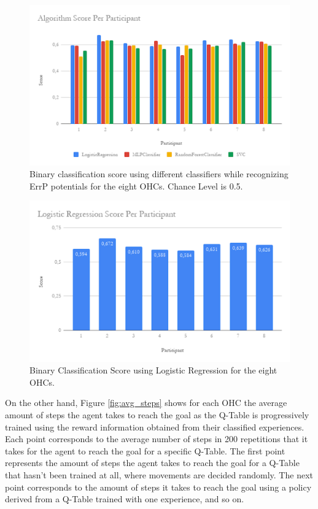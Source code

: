 \documentclass[journal]{IEEEtran}
\begin{document}
{{\begin{figure}[ht]
    \centering
    \includegraphics[scale=0.4]{Images/algorithm_calibration/Total_calib.png}
    \caption{Binary classification score using different classifiers while recognizing ErrP potentials for the eight OHCs.  Chance Level is 0.5.}
    \label{fig:classifiers}
\end{figure}

\begin{figure}[ht]
    \centering
    \includegraphics[scale=0.4]{Images/algorithm_calibration/LR_calib.png}
    \caption{Binary Classification Score using Logistic Regression for the eight OHCs.}
    \label{fig:logisticregression}
\end{figure}

On the other hand, Figure \ref{fig:avg_steps} shows for each OHC the average amount of steps the agent takes to reach the goal as the Q-Table is progressively trained using the reward information obtained from their classified experiences. Each point corresponds to the average number of steps in 200 repetitions that it takes for the agent to reach the goal for a specific Q-Table. The first point represents the amount of steps the agent takes to reach the goal for a Q-Table that hasn't been trained at all, where movements are decided randomly. The next point corresponds to the amount of steps it takes to reach the goal using a policy derived from a Q-Table trained with one experience, and so on.

}}
\end{document}
